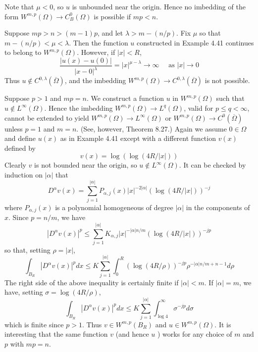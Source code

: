 Note that $\mu<0$, so $u$ is unbounded near the origin. Hence no imbedding of the form $W^{m,p}(\Omega) \rightarrow C_B^0(\Omega)$ is possible if $m p<n$.


\begin{example}
  Suppose $m p>n>(m-1) p$, and let $\lambda>m-(n / p)$. Fix $\mu$ so that $m-(n / p)<\mu<\lambda$. Then the function $u$ constructed in Example 4.41 continues to belong to $W^{m,p}(\Omega)$. However, if $|x|<R$,
  \[
  \frac{|u(x)-u(0)|}{|x-0|^\lambda}=|x|^{\mu-\lambda} \rightarrow \infty \quad \text { as }|x| \rightarrow 0
  \]
  Thus $u \notin C^{0, \lambda}(\overline{\Omega})$, and the imbedding $W^{m,p}(\Omega) \rightarrow C^{0, \lambda}(\overline{\Omega})$ is not possible.
\end{example}

\begin{example}
  Suppose $p>1$ and $m p=n$. We construct a function $u$ in $W^{m,p}(\Omega)$ such that $u \notin L^{\infty}(\Omega)$. Hence the imbedding $W^{m,p}(\Omega) \rightarrow L^q(\Omega)$, valid for $p \leq q<\infty$, cannot be extended to yield $W^{m,p}(\Omega) \rightarrow L^{\infty}(\Omega)$ or $W^{m,p}(\Omega) \rightarrow C^0(\overline{\Omega})$ unless $p=1$ and $m=n$. (See, however, Theorem 8.27.)
  Again we assume $0 \in \Omega$ and define $u(x)$ as in Example 4.41 except with a different function $v(x)$ defined by
  \[
  v(x)=\log (\log (4 R /|x|))
  \]
  Clearly $v$ is not bounded near the origin, so $u \notin L^{\infty}(\Omega)$. It can be checked by induction on $|\alpha|$ that
  \[
  D^\alpha v(x)=\sum_{j=1}^{|\alpha|} P_{\alpha, j}(x)|x|^{-2|\alpha|}(\log (4 R /|x|))^{-j}
  \]
  where $P_{\alpha, j}(x)$ is a polynomial homogeneous of degree $|\alpha|$ in the components of $x$. Since $p=n / m$, we have
  \[
  \left|D^\alpha v(x)\right|^p \leq \sum_{j=1}^{|\alpha|} K_{\alpha, j}|x|^{-|\alpha| n / m}(\log (4 R /|x|))^{-j p}
  \]
  so that, setting $\rho=|x|$,
  \[
  \int_{B_R}\left|D^\alpha v(x)\right|^p d x \leq K \sum_{j=1}^{|\alpha|} \int_0^R(\log (4 R / \rho))^{-j p} \rho^{-|\alpha| n / m+n-1} d \rho
  \]
  The right side of the above inequality is certainly finite if $|\alpha|<m$. If $|\alpha|=m$, we have, setting $\sigma=\log (4 R / \rho)$,
  \[
  \int_{B_R}\left|D^\alpha v(x)\right|^p d x \leq K \sum_{j=1}^{|\alpha|} \int_{\log 4}^{\infty} \sigma^{-j p} d \sigma
  \]
  which is finite since $p>1$. Thus $v \in W^{m, p}\left(B_R\right)$ and $u \in W^{m, p}(\Omega)$.
  It is interesting that the same function $v$ (and hence $u$ ) works for any choice of $m$ and $p$ with $m p=n$.
\end{example}

